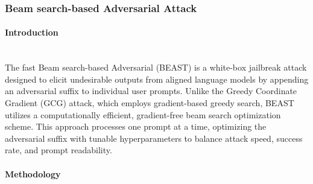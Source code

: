 \documentclass[../main.tex]{subfiles}
\begin{document}
\subsubsection{Beam search-based Adversarial Attack}
\paragraph{Introduction}\leavevmode\\
The fast Beam search-based Adversarial (BEAST) \cite{zou2023universaltransferableadversarialattacks} is a white-box
jailbreak attack designed to elicit undesirable outputs from aligned language
models by appending an adversarial suffix to individual user prompts. Unlike
the Greedy Coordinate Gradient (GCG) attack, which employs gradient-based
greedy search, BEAST utilizes a computationally efficient, gradient-free beam
search optimization scheme. This approach processes one prompt at a time,
optimizing the adversarial suffix with tunable hyperparameters to balance attack speed, success rate, and prompt readability.


\paragraph{Methodology}\leavevmode\\
\end{document}

